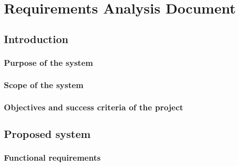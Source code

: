 



\part*{Requirements Analysis Document}


\chapter*{Introduction}

\section*{Purpose of the system}

\section*{Scope of the system}

\section*{Objectives and success criteria of the project}








\chapter*{Proposed system}

\section*{Functional requirements}

